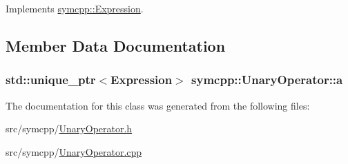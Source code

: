 Implements \hyperlink{classsymcpp_1_1Expression_aaef29b0afa2d6c21fe35f47a1be76134}{symcpp\+::\+Expression}.



\subsection{Member Data Documentation}
\subsubsection[{\texorpdfstring{a}{a}}]{\setlength{\rightskip}{0pt plus 5cm}std\+::unique\+\_\+ptr$<${\bf Expression}$>$ symcpp\+::\+Unary\+Operator\+::a\hspace{0.3cm}{\ttfamily [protected]}}\hypertarget{classsymcpp_1_1UnaryOperator_a1558842963261562d2ef68e324822cba}{}\label{classsymcpp_1_1UnaryOperator_a1558842963261562d2ef68e324822cba}


The documentation for this class was generated from the following files\+:\begin{DoxyCompactItemize}
\item 
src/symcpp/\hyperlink{UnaryOperator_8h}{Unary\+Operator.\+h}\item 
src/symcpp/\hyperlink{UnaryOperator_8cpp}{Unary\+Operator.\+cpp}\end{DoxyCompactItemize}
